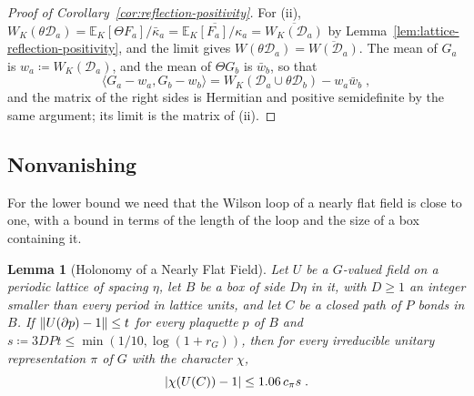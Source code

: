 \documentclass[11pt]{preprint}
\DeclarePairedDelimiter{\abs}{\lvert}{\rvert}
\DeclarePairedDelimiter{\norm}{\lVert}{\rVert}
\numberwithin{equation}{section}
\newtheorem{lemma}[theorem]{Lemma}
\theoremstyle{definition}
\theoremstyle{remark}
\theoremstyle{plain}
\begin{document}
\begin{proof}[Proof of Corollary~\ref{cor:reflection-positivity}]
For (ii), $W_K(\theta\mathcal D_a) = \mathbb E_K[\Theta F_a]/\bar\kappa_a = \overline{\mathbb E_K[F_a]/\kappa_a} = \overline{W_K(\mathcal D_a)}$ by Lemma~\ref{lem:lattice-reflection-positivity}, and the limit gives $W(\theta\mathcal D_a) = \overline{W(\mathcal D_a)}$. The mean of $G_a$ is $w_a \coloneqq W_K(\mathcal D_a)$, and the mean of $\Theta G_b$ is $\bar w_b$, so that
\begin{equation}\label{eq:connected-gram}
    \langle G_a - w_a, G_b - w_b\rangle = W_K(\mathcal D_a \cup \theta\mathcal D_b) - w_a\bar w_b\;,
\end{equation}
and the matrix of the right sides is Hermitian and positive semidefinite by the same argument; its limit is the matrix of (ii).
\end{proof}

\subsection{Nonvanishing}\label{sec:nonvanishing}

For the lower bound we need that the Wilson loop of a nearly flat field is close to one, with a bound in terms of the length of the loop and the size of a box containing it.

\begin{lemma}[Holonomy of a Nearly Flat Field]\label{lem:flat-holonomy}
Let $U$ be a $G$-valued field on a periodic lattice of spacing $\eta$, let $B$ be a box of side $D\eta$ in it, with $D \geq 1$ an integer smaller than every period in lattice units, and let $C$ be a closed path of $P$ bonds in $B$. If $\norm{U(\partial p) - 1} \leq t$ for every plaquette $p$ of $B$ and $s \coloneqq 3DPt \leq \min(1/10, \log(1 + r_G))$, then for every irreducible unitary representation $\pi$ of $G$ with the character $\chi$,
\begin{equation}\label{eq:flat-holonomy}
    \abs{\chi(U(C)) - 1} \leq 1.06\,c_\pi s\;.
\end{equation}
\end{lemma}
\end{document}
